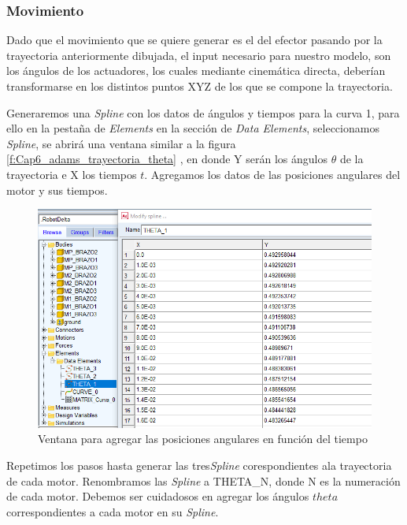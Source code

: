     \subsubsection{Movimiento}
    
    Dado que el movimiento que se quiere generar es el del efector pasando por la trayectoria anteriormente dibujada, el input necesario para nuestro modelo, son los ángulos de los actuadores, los cuales mediante cinemática directa, deberían transformarse en los distintos puntos XYZ de los que se compone la trayectoria. 
    
    Generaremos una \textit{Spline} con los datos de ángulos y tiempos para la curva 1, para ello en la pestaña de \textit{Elements} en la sección de \textit{Data Elements}, seleccionamos \textit{Spline}, se abrirá una ventana similar a la figura \eqref{f:Cap6_adams_trayectoria_theta} , en donde Y serán los ángulos $\theta$ de la trayectoria e X los tiempos $t$. Agregamos los datos de las posiciones angulares del motor y sus tiempos.
    
    \begin{figure}[H]
        \centering
        \includegraphics[width=1\linewidth]{Main/Chapter6/Images6/adams/motions/trayectoriateta.png}
        \caption{Ventana para agregar las posiciones angulares en función del tiempo}
        \label{f:Cap6_adams_trayectoria_theta}
    \end{figure}
    
    
    Repetimos los pasos hasta generar las tres\textit{Spline} corespondientes ala trayectoria de cada motor. Renombramos las \textit{Spline} a THETA\_N, donde N es la numeración de cada motor. Debemos ser cuidadosos en agregar los ángulos $theta$ correspondientes a cada motor en su \textit{Spline}.
    
